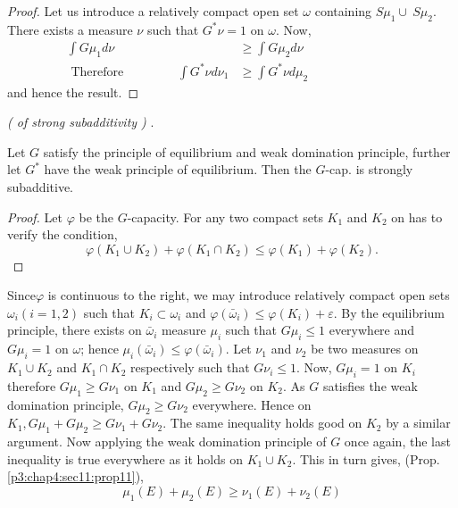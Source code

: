 \begin{proof}
  Let us  introduce a relatively compact open set $ \omega $
  containing  \break $S \mu_1 \cup ~ S \mu_2 $. There exists a measure $\nu$
  such that $G^*  \nu = 1$ on $\omega$. Now, 
  \begin{align*}
    \int G \mu_1 d \nu &\geq \int G \mu_2 d \nu \\
    \text{ Therefore }\qquad \quad \quad 
    \int G^* \nu d \nu_1 & \geq \int G^* \nu d \mu_2 \hspace{3cm}
  \end{align*}
  and hence the result.
\end{proof}

\begin{thm}\label{p3:chap4:sec11:thm8} %
  {\em ( of strong subadditivity ) }.
\end{thm}

Let  $G$ satisfy the principle of  equilibrium and weak domination
principle, further let $G^*$ have the weak principle of
equilibrium. Then the  $G$-cap. is strongly subadditive. 

\begin{proof}
  Let $\varphi$ be the $G$-capacity. For any two compact sets $K_1$
  and $K_2$ on has to verify the condition, 
  $$
  \varphi (K_1 \cup K_2) + \varphi (K_1 \cap K_2) \leq \varphi (K_1) +
  \varphi (K_2). 
  $$
\end{proof}

Since\pageoriginale $\varphi$ is continuous to the  right, we may introduce
relatively compact  open sets  $ \omega_i ( i = 1,2 ) $ such that  $
K_i \subset \omega_i $ and  $ \varphi ( \bar{\omega}_i ) \leq \varphi
(K_i) + \varepsilon $. By the equilibrium principle, there exists on $
\bar{\omega}_i $ measure $ \mu_i $ such that $ G \mu_i \leq 1 $
everywhere and $ G \mu_i  = 1 $ on $ \omega$; hence $ \mu_i (
\bar{\omega}_i ) \leq \varphi ( \bar{\omega}_i )$. Let $\nu_1$ and
$\nu_2$ be two measures on $ K_1 \cup K_2 $ and $ K_1 \cap K_2 $
respectively such that $ G \nu_i \leq 1 $. Now, $ G \mu_i = 1 $ on
$K_i$ therefore  $ G \mu_1 \ge G \nu_1 $ on $K_1$ and  $ G \mu_2 \ge G
\nu_2 $ on $ K_2 $. As $G$ satisfies the weak domination principle, $
G \mu_2 \ge G \nu_2 $ everywhere. Hence on $ K_1, G \mu_1 + G \mu_2
\geq G \nu_1 + G\nu_2 $. The same inequality holds good on $K_2$ by a
similar argument. Now applying the weak domination principle of $G$
once again, the last inequality is  true everywhere as it holds on $
K_1 \cup K_2 $. This in turn gives, (Prop.\ref{p3:chap4:sec11:prop11}),  
$$
\mu_1 (E) + \mu_2 (E) \geq \nu_1 (E) + \nu_2 (E)
$$

